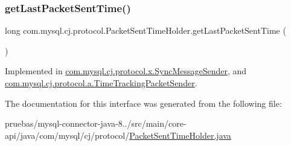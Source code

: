 \subsubsection{\texorpdfstring{get\+Last\+Packet\+Sent\+Time()}{getLastPacketSentTime()}}
{\footnotesize\ttfamily long com.\+mysql.\+cj.\+protocol.\+Packet\+Sent\+Time\+Holder.\+get\+Last\+Packet\+Sent\+Time (\begin{DoxyParamCaption}{ }\end{DoxyParamCaption})}



Implemented in \mbox{\hyperlink{classcom_1_1mysql_1_1cj_1_1protocol_1_1x_1_1_sync_message_sender_a43022535ec5a2b7c1ac10cf339009439}{com.\+mysql.\+cj.\+protocol.\+x.\+Sync\+Message\+Sender}}, and \mbox{\hyperlink{classcom_1_1mysql_1_1cj_1_1protocol_1_1a_1_1_time_tracking_packet_sender_a0db4b1e081138c550906e898d9c9a79d}{com.\+mysql.\+cj.\+protocol.\+a.\+Time\+Tracking\+Packet\+Sender}}.



The documentation for this interface was generated from the following file\+:\begin{DoxyCompactItemize}
\item 
pruebas/mysql-\/connector-\/java-\/8../src/main/core-\/api/java/com/mysql/cj/protocol/\mbox{\hyperlink{_packet_sent_time_holder_8java}{Packet\+Sent\+Time\+Holder.\+java}}\end{DoxyCompactItemize}
